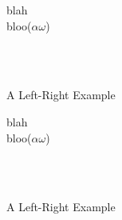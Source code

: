 \documentclass[12pt]{article}
\begin{document}
\begin{landscape}
  \begin{figure}
    \begin{eventchain}[dir=right, dist=0.2cm]
      \state[5]
      \state
      \state
      \state
      \state
      \begin{event}[name=Event, dist=0.7cm]
        blah \\
        bloo($ \alpha \omega $) \\
      \end{event}
      \state
      \begin{fluents}[name=State, dist=0.7cm]
         \\
         \\
      \end{fluents}
      \state
      \state
      \state
      \jumpto[100]
    \end{eventchain}
    \caption{A Left-Right Example}
  \end{figure}

  \par

  \begin{figure}
    \begin{eventchain}[dir=right, dist=0.2cm]
      \state[5]
      \state
      \state
      \jumpto[10]
      \state
      \state
      \begin{event}[name=Event, dist=0.7cm]
        blah \\
        bloo($ \alpha \omega $) \\
      \end{event}
      \state
      \begin{fluents}[name=State, dist=0.7cm]
         \\
         \\
      \end{fluents}
      \state
      \state
      \state
      \jumpto[100]
    \end{eventchain}
    \caption{A Left-Right Example}
  \end{figure}
\end{landscape}

% 
% 
\end{document}
